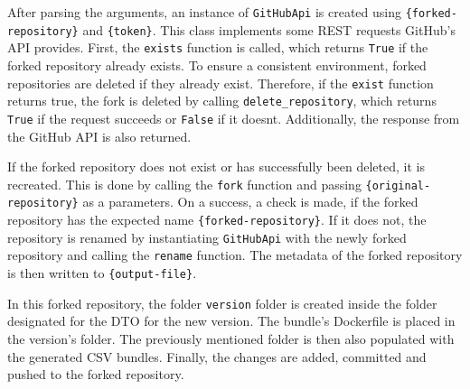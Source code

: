 \pagebreak

After parsing the arguments, an instance of \verb|GitHubApi| is created using \verb|{forked-repository}| and \verb|{token}|.
This class implements some REST requests GitHub's API provides.
First, the \verb|exists| function is called, which returns \verb|True| if the forked repository already exists.
To ensure a consistent environment, forked repositories are deleted if they already exist.
Therefore, if the \verb|exist| function returns true, the fork is deleted by calling \verb|delete_repository|, which returns \verb|True| if the request succeeds or \verb|False| if it doesnt.
Additionally, the response from the GitHub API is also returned.

If the forked repository does not exist or has successfully been deleted, it is recreated.
This is done by calling the \verb|fork| function and passing \verb|{original-repository}| as a parameters.
On a success, a check is made, if the forked repository has the expected name \verb|{forked-repository}|.
If it does not, the repository is renamed by instantiating \verb|GitHubApi| with the newly forked repository and calling the \verb|rename| function.
The metadata of the forked repository is then written to \verb|{output-file}|.

In this forked repository, the folder \verb|version| folder is created inside the folder designated for the DTO for the new version.
The bundle's Dockerfile is placed in the version's folder.
The previously mentioned folder is then also populated with the generated CSV bundles.
Finally, the changes are added, committed and pushed to the forked repository.
